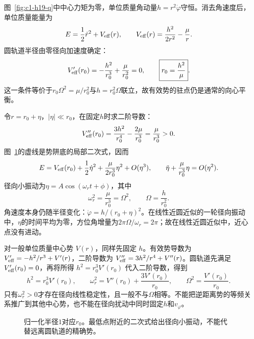 \begin{solution}
图~\ref{fig:c1-h19-q}中中心力矩为零，单位质量角动量$h=r^2\dot\varphi$守恒。消去角速度后，单位质量能量为
\[E=\frac12\dot r^2+V_{\rm eff}(r),\qquad
V_{\rm eff}(r)=\frac{h^2}{2r^2}-\frac\mu r.\]
圆轨道半径由零径向加速度确定：
\[V_{\rm eff}'(r_0)=-\frac{h^2}{r_0^3}+\frac\mu{r_0^2}=0,
\qquad \boxed{r_0=\frac{h^2}{\mu}}.\]
这一条件等价于$r_0\Omega^2=\mu/r_0^2$与$h=r_0^2\Omega$联立，故有效势的驻点仍是通常的向心平衡。

令$r=r_0+\eta$，$|\eta|\ll r_0$，在固定$h$时求二阶导数：
\[V_{\rm eff}''(r_0)=\frac{3h^2}{r_0^4}-\frac{2\mu}{r_0^3}
=\frac\mu{r_0^3}>0.\]
图~\ref{fig:c1-h19-s}的虚线是势阱底的局部二次式，因而
\[E=V_{\rm eff}(r_0)+\frac12\dot\eta^2+
\frac{\mu}{2r_0^3}\eta^2+O(\eta^3),\qquad
\ddot\eta+\frac\mu{r_0^3}\eta=O(\eta^2).\]
径向小振动为$\eta=A\cos(\omega_rt+\phi)$，其中
\[\boxed{\omega_r^2=\frac\mu{r_0^3}=\Omega^2},\qquad \Omega=\frac h{r_0^2}.\]
角速度本身仍随半径变化：$\dot\varphi=h/(r_0+\eta)^2$。在线性近圆近似的一轮径向振动中，$\eta$的时间平均为零，方位角增量为$2\pi\Omega/\omega_r=2\pi$；故在线性近圆近似中，近心点没有进动。

对一般单位质量中心势 $V(r)$，同样先固定 $h$。有效势导数为 $V_{\rm eff}'=-h^2/r^3+V'(r)$，二阶导数为 $V_{\rm eff}''=3h^2/r^4+V''(r)$。圆轨道先满足 $V_{\rm eff}'(r_0)=0$，再将所得 $h^2=r_0^3V'(r_0)$ 代入二阶导数，得到
\[h^2=r_0^3V'(r_0),\qquad
\boxed{\omega_r^2=V''(r_0)+\frac{3V'(r_0)}{r_0}},\qquad
\Omega^2=\frac{V'(r_0)}{r_0}.\]
只有$\omega_r^2>0$才存在径向线性稳定性，且一般不与$\Omega$相等。不能把逆距离势的等频关系推广到其他中心势，也不能在径向扰动中同时固定$h$和$v_\varphi$。

\begin{figure}[H]\centering
{}
\caption{归一化半径$1$对应$r_0$。最低点附近的二次式给出径向小振动，不能代替远离圆轨道的精确势。}\label{fig:c1-h19-s}
\end{figure}
\end{solution}

